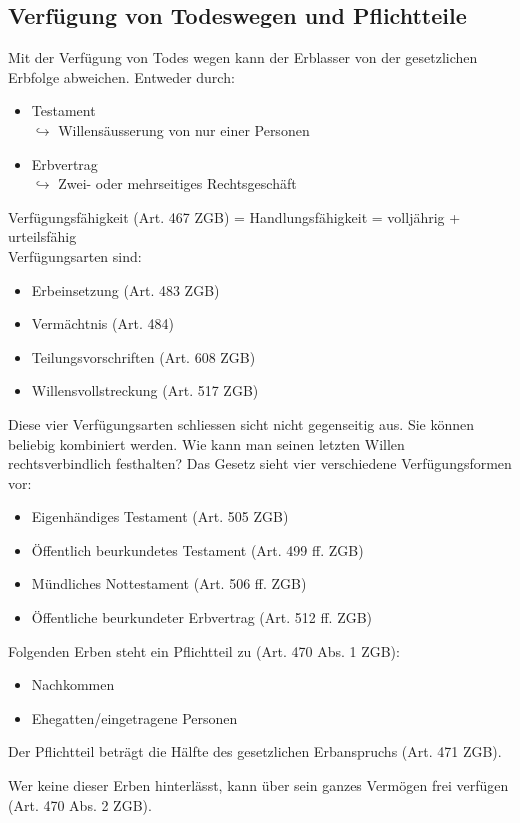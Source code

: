 \documentclass[12pt]{article}
\begin{document}
\subsection{Verfügung von Todeswegen und Pflichtteile}
Mit der Verfügung von Todes wegen kann der Erblasser von der gesetzlichen Erbfolge abweichen. Entweder durch:
\begin{itemize}
    \item Testament\\
    $\hookrightarrow$ Willensäusserung von nur einer Personen
    \item Erbvertrag\\
    $\hookrightarrow$ Zwei- oder mehrseitiges Rechtsgeschäft
\end{itemize}
Verfügungsfähigkeit (Art. 467 ZGB) = Handlungsfähigkeit = volljährig + urteilsfähig\\[10pt]
Verfügungsarten sind:
\begin{itemize}
    \item Erbeinsetzung (Art. 483 ZGB)
    \item Vermächtnis (Art. 484)
    \item Teilungsvorschriften (Art. 608 ZGB)
    \item Willensvollstreckung (Art. 517 ZGB)
\end{itemize}
Diese vier Verfügungsarten schliessen sicht nicht gegenseitig aus. Sie können beliebig kombiniert werden.
\newpage
Wie kann man seinen letzten Willen rechtsverbindlich festhalten? Das Gesetz sieht vier verschiedene Verfügungsformen vor:
\begin{itemize}
    \item Eigenhändiges Testament (Art. 505 ZGB)
    \item Öffentlich beurkundetes Testament (Art. 499 ff. ZGB)
    \item Mündliches Nottestament (Art. 506 ff. ZGB)
    \item Öffentliche beurkundeter Erbvertrag (Art. 512 ff. ZGB)
\end{itemize}
Folgenden Erben steht ein Pflichtteil zu (Art. 470 Abs. 1 ZGB):
\begin{itemize}
    \item Nachkommen
    \item Ehegatten/eingetragene Personen
\end{itemize}
Der Pflichtteil beträgt die Hälfte des gesetzlichen Erbanspruchs (Art. 471 ZGB).

Wer keine dieser Erben hinterlässt, kann über sein ganzes Vermögen frei verfügen (Art. 470 Abs. 2 ZGB).
\end{document}
